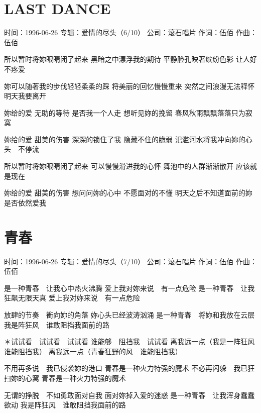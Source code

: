\documentclass[UTF8,a4paper,oneside,twocolumn,12pt]{ctexbook}
\newcommand{\infopair}[2]{\textbullet #1：#2}
\newcommand{\zc}[1][伍佰]{\infopair{作词}{#1}}
\newcommand{\zq}[1][伍佰]{\infopair{作曲}{#1}}
\newcommand{\zj}[1]{\infopair{专辑}{#1}}
\newcommand{\sj}[1]{\infopair{时间}{#1}}
\newcommand{\gs}[1]{\infopair{公司}{#1}}
\newenvironment{info}{\begin{flushleft}\kaishu
	}
	{\end{flushleft}\normalsize\yahei\par}
\newenvironment{lyric}{
	}
{}
\begin{document}
\section{LAST DANCE}
\begin{info}
	\sj{1996-06-26}
	\zj{爱情的尽头（6/10）}
	\gs{滚石唱片}
	\zc
	\zq
\end{info}
\begin{lyric}
	所以暂时将妳眼睛闭了起来
	黑暗之中漂浮我的期待
	平静脸孔映著缤纷色彩
	让人好不疼爱

	妳可以随著我的步伐轻轻柔柔的踩
	将美丽的回忆慢慢重来
	突然之间浪漫无法释怀
	明天我要离开

	妳给的爱
	无助的等待
	是否我一个人走
	想听见妳的挽留
	春风秋雨飘飘落落只为寂寞

	妳给的爱
	甜美的伤害
	深深的锁住了我
	隐藏不住的脆弱
	氾滥河水将我冲向妳的心头　不停流

	所以暂时将妳眼睛闭了起来
	可以慢慢滑进我的心怀
	舞池中的人群渐渐散开
	应该就是现在

	妳给的爱
	甜美的伤害
	想问问妳的心中
	不愿面对的不懂
	明天之后不知道面前的妳是否依然爱我
\end{lyric}

\section{青春}
\begin{info}
	\sj{1996-06-26}
	\zj{爱情的尽头（7/10）}
	\gs{滚石唱片}
	\zc
	\zq
\end{info}
\begin{lyric}
	是一种青春　让我心中热火沸腾
	爱上我对妳来说　有一点危险
	是一种青春　让我狂飙无限天真
	爱上我对妳来说　有一点危险

	放肆的节奏　衝向妳的角落
	妳心头已经波涛汹涌
	是一种青春　将妳和我放在云层
	我是阵狂风　谁敢阻挡我面前的路

	＊试试看　试试看　试试看
	谁能够　阻挡我　试试看
	离我远一点（我是一阵狂风　谁能阻挡我）
	离我远一点（青春狂野的风　谁能阻挡我）

	不用再多说　我已侵袭妳的港口
	青春是一种火力特强的魔术
	不必再闪躲　我已狂扫妳的心窝
	青春是一种火力特强的魔术

	无谓的挣脱　不如勇敢面对自我
	面对妳掉入爱的迷惑
	是一种青春　让我浑身蠢蠢欲动
	我是阵狂风　谁敢阻挡我面前的路
\end{lyric}
\end{document}
